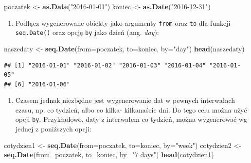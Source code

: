 \documentclass[]{book}
\newenvironment{Shaded}{\begin{snugshade}}{\end{snugshade}}
\newcommand{\KeywordTok}[1]{\textcolor[rgb]{0.13,0.29,0.53}{\textbf{#1}}}
\newcommand{\DataTypeTok}[1]{\textcolor[rgb]{0.13,0.29,0.53}{#1}}
\newcommand{\StringTok}[1]{\textcolor[rgb]{0.31,0.60,0.02}{#1}}
\newcommand{\NormalTok}[1]{#1}
\providecommand{\tightlist}{%
  \setlength{\itemsep}{0pt}\setlength{\parskip}{0pt}}
\theoremstyle{definition}
\theoremstyle{definition}
\theoremstyle{definition}
\theoremstyle{remark}
\begin{document}
\begin{Shaded}
\begin{Highlighting}[]
\NormalTok{poczatek <-}\StringTok{ }\KeywordTok{as.Date}\NormalTok{(}\StringTok{"2016-01-01"}\NormalTok{)}
\NormalTok{koniec <-}\StringTok{ }\KeywordTok{as.Date}\NormalTok{(}\StringTok{"2016-12-31"}\NormalTok{)}
\end{Highlighting}
\end{Shaded}

\begin{enumerate}
\def\labelenumi{\arabic{enumi}.}
\setcounter{enumi}{1}
\tightlist
\item
  Podłącz wygenerowane obiekty jako argumenty \texttt{from} oraz
  \texttt{to} dla funkcji \texttt{seq.Date()} oraz opcję \texttt{by}
  jako dzień (ang. \emph{day}):
\end{enumerate}

\begin{Shaded}
\begin{Highlighting}[]
\NormalTok{naszedaty <-}\StringTok{ }\KeywordTok{seq.Date}\NormalTok{(}\DataTypeTok{from=}\NormalTok{poczatek, }\DataTypeTok{to=}\NormalTok{koniec, }\DataTypeTok{by=}\StringTok{"day"}\NormalTok{)}
\KeywordTok{head}\NormalTok{(naszedaty)}
\end{Highlighting}
\end{Shaded}

\begin{verbatim}
## [1] "2016-01-01" "2016-01-02" "2016-01-03" "2016-01-04" "2016-01-05"
## [6] "2016-01-06"
\end{verbatim}

\begin{enumerate}
\def\labelenumi{\arabic{enumi}.}
\setcounter{enumi}{2}
\tightlist
\item
  Czasem jednak niezbędne jest wygenerowanie dat w pewnych interwałach
  czasu, np. co tydzień, albo co kilka- kilkanaście dni. Do tego celu
  można użyć opcji \texttt{by}. Przykładowo, daty z interwałem co
  tydzień, można wygenerować wg jednej z poniższych opcji:
\end{enumerate}

\begin{Shaded}
\begin{Highlighting}[]
\NormalTok{cotydzien1 <-}\StringTok{ }\KeywordTok{seq.Date}\NormalTok{(}\DataTypeTok{from=}\NormalTok{poczatek, }\DataTypeTok{to=}\NormalTok{koniec, }\DataTypeTok{by=}\StringTok{"week"}\NormalTok{)}
\NormalTok{cotydzien2 <-}\StringTok{ }\KeywordTok{seq.Date}\NormalTok{(}\DataTypeTok{from=}\NormalTok{poczatek, }\DataTypeTok{to=}\NormalTok{koniec, }\DataTypeTok{by=}\StringTok{"7 days"}\NormalTok{)}
\KeywordTok{head}\NormalTok{(cotydzien1)}
\end{Highlighting}
\end{Shaded}
\end{document}
